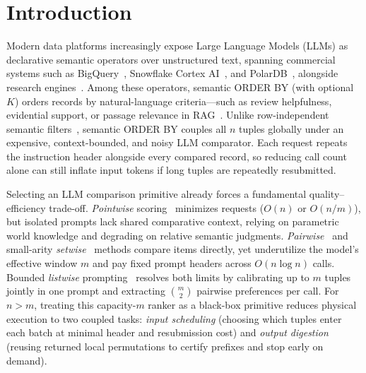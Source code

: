 \section{Introduction}
\label{sec:intro}

Modern data platforms increasingly expose Large Language Models (LLMs) as declarative semantic operators over unstructured text, spanning commercial systems such as BigQuery~\cite{google2026bigqueryai}, Snowflake Cortex AI~\cite{snowflake2026cortexai}, and PolarDB~\cite{alibaba2026polardbai}, alongside research engines~\cite{DBLP:journals/pvldb/PatelJPGAGZ25,DBLP:journals/corr/abs-2603-11622,DBLP:journals/pvldb/WangLWXL25}. Among these operators, semantic \textsf{ORDER BY} (with optional \LIMIT~$K$) orders records by natural-language criteria—such as review helpfulness, evidential support, or passage relevance in RAG~\cite{DBLP:conf/nips/YuP0WYZSC24}. Unlike row-independent semantic filters~\cite{DBLP:journals/pacmmod/ZeighamiSP25,DBLP:journals/corr/abs-2509-12610}, semantic \textsf{ORDER BY} couples all $n$ tuples globally under an expensive, context-bounded, and noisy LLM comparator. Each request repeats the instruction header alongside every compared record, so reducing call count alone can still inflate input tokens if long tuples are repeatedly resubmitted.

Selecting an LLM comparison primitive already forces a fundamental quality--efficiency trade-off. \emph{Pointwise} scoring~\cite{DBLP:conf/emnlp/DrozdovZD0RWAIM23,DBLP:conf/emnlp/SachanLJAYPZ22} minimizes requests ($O(n)$ or $O(n/m)$), but isolated prompts lack shared comparative context, relying on parametric world knowledge and degrading on relative semantic judgments. \emph{Pairwise}~\cite{DBLP:conf/acl/LuoCH024,DBLP:conf/naacl/QinJHZWYSLLMWB24,DBLP:journals/pvldb/PatelJPGAGZ25} and small-arity \emph{setwise}~\cite{DBLP:conf/sigir/ZhuangZKZ24} methods compare items directly, yet underutilize the model's effective window $m$ and pay fixed prompt headers across $O(n\log n)$ calls. Bounded \emph{listwise} prompting~\cite{DBLP:conf/emnlp/0001YMWRCYR23,DBLP:journals/corr/abs-2305-02156} resolves both limits by calibrating up to $m$ tuples jointly in one prompt and extracting $\binom{m}{2}$ pairwise preferences per call. For $n > m$, treating this capacity-$m$ ranker as a black-box primitive reduces physical execution to two coupled tasks: \emph{input scheduling} (choosing which tuples enter each batch at minimal header and resubmission cost) and \emph{output digestion} (reusing returned local permutations to certify prefixes and stop early on demand).


